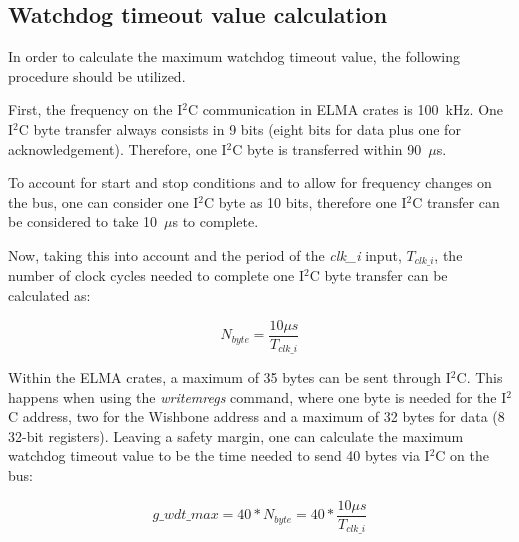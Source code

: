 \documentclass[a4paper,11pt]{article}
\begin{document}
\pagebreak
\begin{appendices}

\section{Watchdog timeout value calculation}
\label{app:wdto-calc}

In order to calculate the maximum watchdog timeout value, the following procedure
should be utilized.

First, the frequency on the I$^2$C communication in ELMA crates is 100~kHz. One
I$^2$C byte transfer always consists in 9 bits (eight bits for data plus one for
acknowledgement). Therefore, one I$^2$C byte is transferred within 90~$\mu$s.

To account for start and stop conditions and to allow for frequency changes on
the bus, one can consider one I$^2$C byte as 10 bits, therefore one I$^2$C
transfer can be considered to take 10~$\mu$s to complete.

Now, taking this into account and the period of the \textit{clk\_i} input,
$T_{clk\_i}$, the number of clock cycles needed to complete one I$^2$C byte transfer
can be calculated as:

\begin{equation}
N_{byte} = \frac{10 {\mu}s}{T_{clk\_i}}
\end{equation}

Within the ELMA crates, a maximum of 35 bytes can be sent through I$^2$C. This
happens when using the \textit{writemregs} command, where one byte is needed
for the I$^2$C address, two for the Wishbone address and a maximum of 32 bytes for
data (8 32-bit registers). Leaving a safety margin, one can calculate the
maximum watchdog timeout value to be the time needed to send 40 bytes via I$^2$C
on the bus:

\begin{equation}
g\_wdt\_max = 40 * N_{byte} = 40 * \frac{10 {\mu}s}{T_{clk\_i}}
\end{equation}

\end{appendices}

\pagebreak


\end{document}
